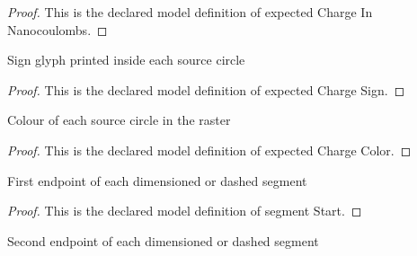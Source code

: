\begin{proof}
  This is the declared model definition of expected Charge In Nanocoulombs.
\end{proof}
\begin{definition}
  \label{def:physics:phyx-mini-0994:phyxminiproblems-problemphyxmini0994-expectedchargesign}
  Sign glyph printed inside each source circle
\end{definition}
\begin{proof}
  This is the declared model definition of expected Charge Sign.
\end{proof}
\begin{definition}
  \label{def:physics:phyx-mini-0994:phyxminiproblems-problemphyxmini0994-expectedchargecolor}
  Colour of each source circle in the raster
\end{definition}
\begin{proof}
  This is the declared model definition of expected Charge Color.
\end{proof}
\begin{definition}
  \label{def:physics:phyx-mini-0994:phyxminiproblems-problemphyxmini0994-segmentstart}
  First endpoint of each dimensioned or dashed segment
\end{definition}
\begin{proof}
  This is the declared model definition of segment Start.
\end{proof}
\begin{definition}
  \label{def:physics:phyx-mini-0994:phyxminiproblems-problemphyxmini0994-segmentend}
  Second endpoint of each dimensioned or dashed segment
\end{definition}
